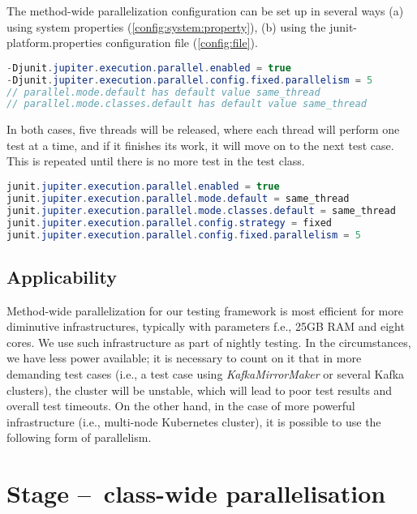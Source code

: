 The method-wide parallelization configuration can be set up in several ways (a) using system properties (\ref{config:system:property}),
(b) using the junit-platform.properties configuration file (\ref{config:file}).
\begin{lstlisting}[language= Java,label=config:system:property,caption=(a) Configuration via system properties,frame=tb]
-Djunit.jupiter.execution.parallel.enabled = true
-Djunit.jupiter.execution.parallel.config.fixed.parallelism = 5
// parallel.mode.default has default value same_thread
// parallel.mode.classes.default has default value same_thread
\end{lstlisting}
In both cases, five threads will be released, where each thread will perform one test at a time, and if it finishes its work, it will move on to the next test case. This is repeated until there is no more test in the test class.
\begin{lstlisting}[language=Java,label=config:file,caption=(b) Configuration via file,frame = tb]
junit.jupiter.execution.parallel.enabled = true
junit.jupiter.execution.parallel.mode.default = same_thread
junit.jupiter.execution.parallel.mode.classes.default = same_thread
junit.jupiter.execution.parallel.config.strategy = fixed
junit.jupiter.execution.parallel.config.fixed.parallelism = 5
\end{lstlisting}

\subsection{Applicability}
\label{05:sub:sec:applicability}

Method-wide parallelization for our testing framework is most efficient for more diminutive infrastructures,
typically with parameters f.e., 25GB RAM and eight cores. We use such infrastructure as part of nightly testing.
In the circumstances, we have less power available; it is necessary to count on it that in more demanding test cases
(i.e., a test case using \emph{KafkaMirrorMaker} or several Kafka clusters), the cluster will be unstable, which will
lead to poor test results and overall test timeouts. On the other hand, in the case of more powerful infrastructure
(i.e., multi-node Kubernetes cluster), it is possible to use the following form of parallelism.

\section{Stage \---\ class-wide parallelisation}
\label{05:sec:class:wide:parallelism}

